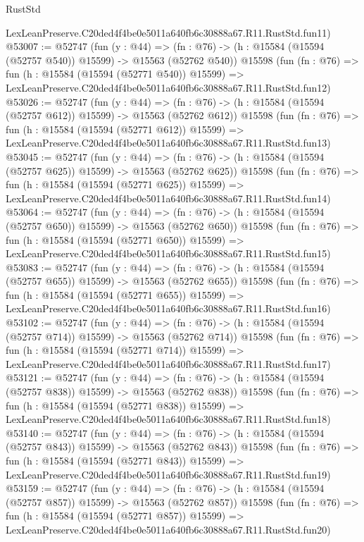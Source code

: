 \begin{lexlean}{RustStd}
\begin{coremodule}
    LexLeanPreserve.C20ded4f4be0e5011a640fb6c30888a67.R11.RustStd.fun11)
@53007 := @52747
    (fun (y : @44) =>
    (fn : @76) -> (h : @15584 (@15594 (@52757 @540)) @15599) -> @15563 (@52762 @540))
    @15598
    (fun (fn : @76) =>
    fun (h : @15584 (@15594 (@52771 @540)) @15599) =>
    LexLeanPreserve.C20ded4f4be0e5011a640fb6c30888a67.R11.RustStd.fun12)
@53026 := @52747
    (fun (y : @44) =>
    (fn : @76) -> (h : @15584 (@15594 (@52757 @612)) @15599) -> @15563 (@52762 @612))
    @15598
    (fun (fn : @76) =>
    fun (h : @15584 (@15594 (@52771 @612)) @15599) =>
    LexLeanPreserve.C20ded4f4be0e5011a640fb6c30888a67.R11.RustStd.fun13)
@53045 := @52747
    (fun (y : @44) =>
    (fn : @76) -> (h : @15584 (@15594 (@52757 @625)) @15599) -> @15563 (@52762 @625))
    @15598
    (fun (fn : @76) =>
    fun (h : @15584 (@15594 (@52771 @625)) @15599) =>
    LexLeanPreserve.C20ded4f4be0e5011a640fb6c30888a67.R11.RustStd.fun14)
@53064 := @52747
    (fun (y : @44) =>
    (fn : @76) -> (h : @15584 (@15594 (@52757 @650)) @15599) -> @15563 (@52762 @650))
    @15598
    (fun (fn : @76) =>
    fun (h : @15584 (@15594 (@52771 @650)) @15599) =>
    LexLeanPreserve.C20ded4f4be0e5011a640fb6c30888a67.R11.RustStd.fun15)
@53083 := @52747
    (fun (y : @44) =>
    (fn : @76) -> (h : @15584 (@15594 (@52757 @655)) @15599) -> @15563 (@52762 @655))
    @15598
    (fun (fn : @76) =>
    fun (h : @15584 (@15594 (@52771 @655)) @15599) =>
    LexLeanPreserve.C20ded4f4be0e5011a640fb6c30888a67.R11.RustStd.fun16)
@53102 := @52747
    (fun (y : @44) =>
    (fn : @76) -> (h : @15584 (@15594 (@52757 @714)) @15599) -> @15563 (@52762 @714))
    @15598
    (fun (fn : @76) =>
    fun (h : @15584 (@15594 (@52771 @714)) @15599) =>
    LexLeanPreserve.C20ded4f4be0e5011a640fb6c30888a67.R11.RustStd.fun17)
@53121 := @52747
    (fun (y : @44) =>
    (fn : @76) -> (h : @15584 (@15594 (@52757 @838)) @15599) -> @15563 (@52762 @838))
    @15598
    (fun (fn : @76) =>
    fun (h : @15584 (@15594 (@52771 @838)) @15599) =>
    LexLeanPreserve.C20ded4f4be0e5011a640fb6c30888a67.R11.RustStd.fun18)
@53140 := @52747
    (fun (y : @44) =>
    (fn : @76) -> (h : @15584 (@15594 (@52757 @843)) @15599) -> @15563 (@52762 @843))
    @15598
    (fun (fn : @76) =>
    fun (h : @15584 (@15594 (@52771 @843)) @15599) =>
    LexLeanPreserve.C20ded4f4be0e5011a640fb6c30888a67.R11.RustStd.fun19)
@53159 := @52747
    (fun (y : @44) =>
    (fn : @76) -> (h : @15584 (@15594 (@52757 @857)) @15599) -> @15563 (@52762 @857))
    @15598
    (fun (fn : @76) =>
    fun (h : @15584 (@15594 (@52771 @857)) @15599) =>
    LexLeanPreserve.C20ded4f4be0e5011a640fb6c30888a67.R11.RustStd.fun20)

\end{coremodule}
\end{lexlean}
